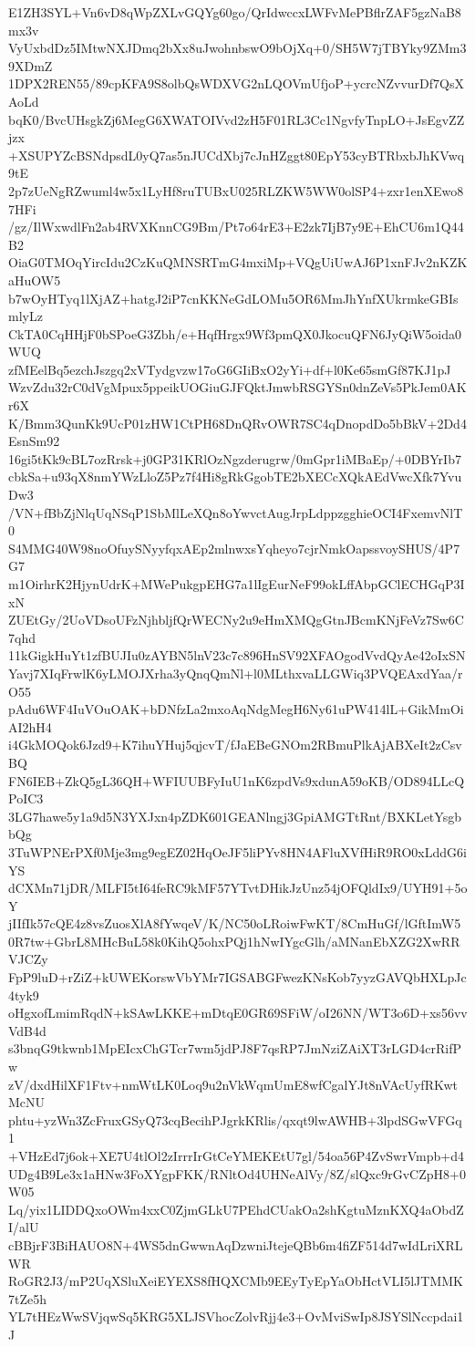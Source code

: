 E1ZH3SYL+Vn6vD8qWpZXLvGQYg60go/QrIdwccxLWFvMePBflrZAF5gzNaB8mx3v
VyUxbdDz5IMtwNXJDmq2bXx8uJwohnbswO9bOjXq+0/SH5W7jTBYky9ZMm39XDmZ
1DPX2REN55/89cpKFA9S8olbQsWDXVG2nLQOVmUfjoP+ycrcNZvvurDf7QsXAoLd
bqK0/BvcUHsgkZj6MegG6XWATOIVvd2zH5F01RL3Cc1NgvfyTnpLO+JsEgvZZjzx
+XSUPYZcBSNdpsdL0yQ7as5nJUCdXbj7cJnHZggt80EpY53cyBTRbxbJhKVwq9tE
2p7zUeNgRZwuml4w5x1LyHf8ruTUBxU025RLZKW5WW0olSP4+zxr1enXEwo87HFi
/gz/IlWxwdlFn2ab4RVXKnnCG9Bm/Pt7o64rE3+E2zk7IjB7y9E+EhCU6m1Q44B2
OiaG0TMOqYircIdu2CzKuQMNSRTmG4mxiMp+VQgUiUwAJ6P1xnFJv2nKZKaHuOW5
b7wOyHTyq1lXjAZ+hatgJ2iP7cnKKNeGdLOMu5OR6MmJhYnfXUkrmkeGBIsmlyLz
CkTA0CqHHjF0bSPoeG3Zbh/e+HqfHrgx9Wf3pmQX0JkocuQFN6JyQiW5oida0WUQ
zfMEelBq5ezchJszgq2xVTydgvzw17oG6GIiBxO2yYi+df+l0Ke65smGf87KJ1pJ
WzvZdu32rC0dVgMpux5ppeikUOGiuGJFQktJmwbRSGYSn0dnZeVs5PkJem0AKr6X
K/Bmm3QunKk9UcP01zHW1CtPH68DnQRvOWR7SC4qDnopdDo5bBkV+2Dd4EsnSm92
16gi5tKk9cBL7ozRrsk+j0GP31KRlOzNgzderugrw/0mGpr1iMBaEp/+0DBYrIb7
cbkSa+u93qX8nmYWzLloZ5Pz7f4Hi8gRkGgobTE2bXECcXQkAEdVwcXfk7YvuDw3
/VN+fBbZjNlqUqNSqP1SbMlLeXQn8oYwvctAugJrpLdppzgghieOCI4FxemvNlT0
S4MMG40W98noOfuySNyyfqxAEp2mlnwxsYqheyo7cjrNmkOapssvoySHUS/4P7G7
m1OirhrK2HjynUdrK+MWePukgpEHG7a1lIgEurNeF99okLffAbpGClECHGqP3IxN
ZUEtGy/2UoVDsoUFzNjhbljfQrWECNy2u9eHmXMQgGtnJBcmKNjFeVz7Sw6C7qhd
11kGigkHuYt1zfBUJIu0zAYBN5lnV23c7c896HnSV92XFAOgodVvdQyAe42oIxSN
Yavj7XIqFrwlK6yLMOJXrha3yQnqQmNl+l0MLthxvaLLGWiq3PVQEAxdYaa/rO55
pAdu6WF4IuVOuOAK+bDNfzLa2mxoAqNdgMegH6Ny61uPW414lL+GikMmOiAI2hH4
i4GkMOQok6Jzd9+K7ihuYHuj5qjcvT/fJaEBeGNOm2RBmuPlkAjABXeIt2zCsvBQ
FN6IEB+ZkQ5gL36QH+WFIUUBFyIuU1nK6zpdVs9xdunA59oKB/OD894LLcQPoIC3
3LG7hawe5y1a9d5N3YXJxn4pZDK601GEANlngj3GpiAMGTtRnt/BXKLetYsgbbQg
3TuWPNErPXf0Mje3mg9egEZ02HqOeJF5liPYv8HN4AFluXVfHiR9RO0xLddG6iYS
dCXMn71jDR/MLFI5tI64feRC9kMF57YTvtDHikJzUnz54jOFQldIx9/UYH91+5oY
jIIfIk57cQE4z8vsZuosXlA8fYwqeV/K/NC50oLRoiwFwKT/8CmHuGf/lGftImW5
0R7tw+GbrL8MHcBuL58k0KihQ5ohxPQj1hNwIYgcGlh/aMNanEbXZG2XwRRVJCZy
FpP9luD+rZiZ+kUWEKorswVbYMr7IGSABGFwezKNsKob7yyzGAVQbHXLpJc4tyk9
oHgxofLmimRqdN+kSAwLKKE+mDtqE0GR69SFiW/oI26NN/WT3o6D+xs56vvVdB4d
s3bnqG9tkwnb1MpEIcxChGTcr7wm5jdPJ8F7qsRP7JmNziZAiXT3rLGD4crRifPw
zV/dxdHilXF1Ftv+nmWtLK0Loq9u2nVkWqmUmE8wfCgalYJt8nVAcUyfRKwtMcNU
phtu+yzWn3ZcFruxGSyQ73cqBecihPJgrkKRlis/qxqt9lwAWHB+3lpdSGwVFGq1
+VHzEd7j6ok+XE7U4tlOl2zIrrrIrGtCeYMEKEtU7gl/54oa56P4ZvSwrVmpb+d4
UDg4B9Le3x1aHNw3FoXYgpFKK/RNltOd4UHNeAlVy/8Z/slQxc9rGvCZpH8+0W05
Lq/yix1LIDDQxoOWm4xxC0ZjmGLkU7PEhdCUakOa2shKgtuMznKXQ4aObdZI/alU
cBBjrF3BiHAUO8N+4WS5dnGwwnAqDzwniJtejeQBb6m4fiZF514d7wIdLriXRLWR
RoGR2J3/mP2UqXSluXeiEYEXS8fHQXCMb9EEyTyEpYaObHctVLI5lJTMMK7tZe5h
YL7tHEzWwSVjqwSq5KRG5XLJSVhocZolvRjj4e3+OvMviSwIp8JSYSlNccpdai1J
